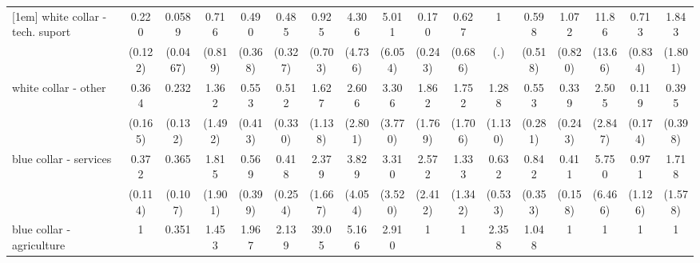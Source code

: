 {\begin{tabular}{l*{16}{c}}
[1em]
white collar - tech. suport&       0.220\sym{**} &      0.0589\sym{***}&       0.716         &       0.490         &       0.485         &       0.925         &       4.306         &       5.011         &       0.170         &       0.627         &           1         &       0.598         &       1.072         &       11.86\sym{*}  &       0.713         &       1.843         \\
                    &     (0.122)         &    (0.0467)         &     (0.819)         &     (0.368)         &     (0.327)         &     (0.703)         &     (4.736)         &     (6.054)         &     (0.243)         &     (0.686)         &         (.)         &     (0.518)         &     (0.820)         &     (13.66)         &     (0.834)         &     (1.801)         \\
[1em]
white collar - other&       0.364\sym{*}  &       0.232\sym{*}  &       1.362         &       0.553         &       0.512         &       1.627         &       2.606         &       3.306         &       1.862         &       1.752         &       1.288         &       0.553         &       0.339         &       2.505         &       0.119         &       0.395         \\
                    &     (0.165)         &     (0.132)         &     (1.492)         &     (0.413)         &     (0.330)         &     (1.138)         &     (2.801)         &     (3.770)         &     (1.769)         &     (1.706)         &     (1.130)         &     (0.281)         &     (0.243)         &     (2.847)         &     (0.174)         &     (0.398)         \\
[1em]
blue collar - services&       0.372\sym{**} &       0.365\sym{***}&       1.815         &       0.569         &       0.418         &       2.379         &       3.829         &       3.310         &       2.572         &       1.333         &       0.632         &       0.842         &       0.411\sym{*}  &       5.750         &       0.971         &       1.718         \\
                    &     (0.114)         &     (0.107)         &     (1.901)         &     (0.399)         &     (0.254)         &     (1.667)         &     (4.054)         &     (3.520)         &     (2.412)         &     (1.342)         &     (0.533)         &     (0.353)         &     (0.158)         &     (6.466)         &     (1.126)         &     (1.578)         \\
[1em]
blue collar - agriculture&           1         &       0.351         &       1.453         &       1.967         &       2.139         &       39.05\sym{**} &       5.166         &       2.910         &           1         &           1         &       2.358         &       1.048         &           1         &           1         &           1         &           1         \\

\end{tabular}}
